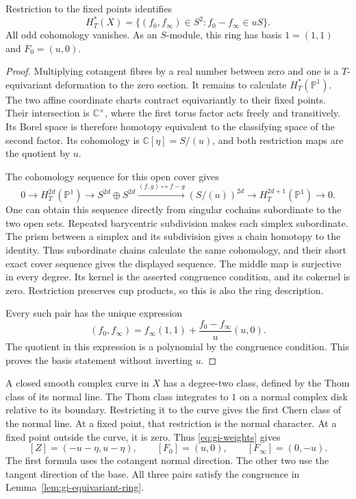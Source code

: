 \begin{lemma}\label{lem:gi-equivariant-ring}
Restriction to the fixed points identifies
\[
 H_T^*(X)=\{(f_0,f_\infty)\in S^2:
                      f_0-f_\infty\in uS\}.
\]
All odd cohomology vanishes.
As an $S$-module, this ring has basis $1=(1,1)$ and $F_0=(u,0)$.
\end{lemma}
\begin{proof}
Multiplying cotangent fibres by a real number between zero and one is a $T$-equivariant deformation to the zero section.
It remains to calculate $H_T^*(\mathbb P^1)$.
The two affine coordinate charts contract equivariantly to their fixed points.
Their intersection is $\mathbb C^\times$, where the first torus factor acts freely and transitively.
Its Borel space is therefore homotopy equivalent to the classifying space of the second factor.
Its cohomology is $\mathbb C[\eta]=S/(u)$, and both restriction maps are the quotient by $u$.

The cohomology sequence for this open cover gives
\[
 0\longrightarrow H_T^{2d}(\mathbb P^1)
 \longrightarrow S^{2d}\oplus S^{2d}
 \xrightarrow{(f,g)\mapsto f-g} (S/(u))^{2d}
 \longrightarrow H_T^{2d+1}(\mathbb P^1)\longrightarrow0.
\]
One can obtain this sequence directly from singular cochains subordinate to the two open sets.
Repeated barycentric subdivision makes each simplex subordinate.
The prism between a simplex and its subdivision gives a chain homotopy to the identity.
Thus subordinate chains calculate the same cohomology, and their short exact cover sequence gives the displayed sequence.
The middle map is surjective in every degree.
Its kernel is the asserted congruence condition, and its cokernel is zero.
Restriction preserves cup products, so this is also the ring description.

Every such pair has the unique expression
\[
 (f_0,f_\infty)=f_\infty(1,1)
          +\frac{f_0-f_\infty}{u}(u,0).
\]
The quotient in this expression is a polynomial by the congruence condition.
This proves the basis statement without inverting $u$.
\end{proof}

A closed smooth complex curve in $X$ has a degree-two class, defined by the Thom class of its normal line.
The Thom class integrates to $1$ on a normal complex disk relative to its boundary.
Restricting it to the curve gives the first Chern class of the normal line.
At a fixed point, that restriction is the normal character.
At a fixed point outside the curve, it is zero.
Thus \eqref{eq:gi-weights} gives
\begin{equation}\label{eq:gi-curves}
 [Z]=(-u-\eta,u-\eta),\qquad
 [F_0]=(u,0),\qquad [F_\infty]=(0,-u).
\end{equation}
The first formula uses the cotangent normal direction.
The other two use the tangent direction of the base.
All three pairs satisfy the congruence in Lemma~\ref{lem:gi-equivariant-ring}.

